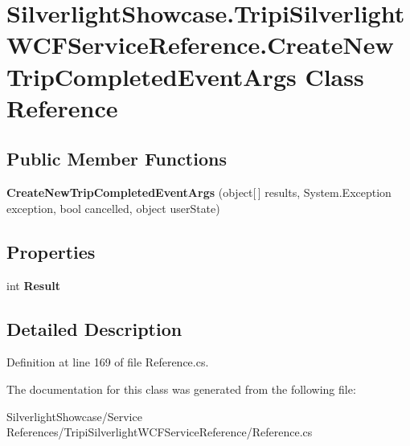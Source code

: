 \hypertarget{class_silverlight_showcase_1_1_tripi_silverlight_w_c_f_service_reference_1_1_create_new_trip_completed_event_args}{
\section{SilverlightShowcase.TripiSilverlightWCFServiceReference.CreateNewTripCompletedEventArgs Class Reference}
\label{class_silverlight_showcase_1_1_tripi_silverlight_w_c_f_service_reference_1_1_create_new_trip_completed_event_args}
}
\subsection*{Public Member Functions}
\begin{DoxyCompactItemize}
\item 
\hypertarget{class_silverlight_showcase_1_1_tripi_silverlight_w_c_f_service_reference_1_1_create_new_trip_completed_event_args_a4f13572622fa4b75c6dc88ab851ffa00}{
{\bfseries CreateNewTripCompletedEventArgs} (object\mbox{[}$\,$\mbox{]} results, System.Exception exception, bool cancelled, object userState)}
\label{class_silverlight_showcase_1_1_tripi_silverlight_w_c_f_service_reference_1_1_create_new_trip_completed_event_args_a4f13572622fa4b75c6dc88ab851ffa00}

\end{DoxyCompactItemize}
\subsection*{Properties}
\begin{DoxyCompactItemize}
\item 
\hypertarget{class_silverlight_showcase_1_1_tripi_silverlight_w_c_f_service_reference_1_1_create_new_trip_completed_event_args_a82bc98c450db4c14d75c39b94a1625a0}{
int {\bfseries Result}}
\label{class_silverlight_showcase_1_1_tripi_silverlight_w_c_f_service_reference_1_1_create_new_trip_completed_event_args_a82bc98c450db4c14d75c39b94a1625a0}

\end{DoxyCompactItemize}


\subsection{Detailed Description}


Definition at line 169 of file Reference.cs.

The documentation for this class was generated from the following file:\begin{DoxyCompactItemize}
\item 
SilverlightShowcase/Service References/TripiSilverlightWCFServiceReference/Reference.cs\end{DoxyCompactItemize}
